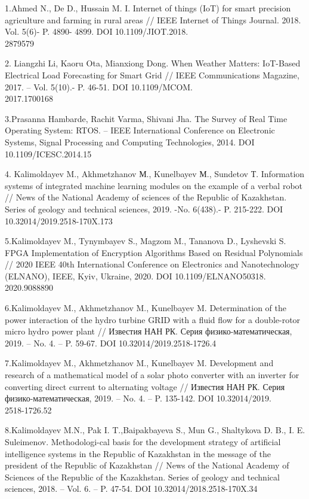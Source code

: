 \begin{noparindent}
1.Ahmed N., De D., Hussain M. I. Internet of things (IoT) for smart
precision agriculture and farming in rural areas // IEEE Internet of
Things Journal. 2018. Vol. 5(6)- P. 4890- 4899.
DOI 10.1109/JIOT.2018.\\2879579

2. Liangzhi Li, Kaoru Ota, Mianxiong Dong. When Weather Matters:
IoT-Based Electrical Load Forecasting for Smart Grid // IEEE
Communications Magazine, 2017. -- Vol. 5(10).- P. 46-51. DOI
10.1109/MCOM.\\2017.1700168

3.Prasanna Hambarde, Rachit Varma, Shivani Jha. The Survey of Real Time
Operating System: RTOS. -- IEEE International Conference on Electronic
Systems, Signal Processing and Computing Technologies, 2014. DOI
10.1109/ICESC.2014.15

4. Kalimoldayev M., Akhmetzhanov М., Kunelbayev М., Sundetov Т.
Information systems of integrated machine learning modules on the
example of a verbal robot // News of the National Academy of sciences of
the Republic of Kazakhstan. Series of geology and technical sciences,
2019. -No. 6(438).- P. 215-222. DOI 10.32014/2019.2518-170X.173

5.Kalimoldayev M., Tynymbayev S., Magzom M., Tananova D., Lyshevski S.
FPGA Implementation of Encryption Algorithms Based on Residual
Polynomials // 2020 IEEE 40th International Conference on Electronics
and Nanotechnology (ELNANO), IEEE, Kyiv, Ukraine, 2020. DOI
10.1109/ELNANO50318.\\2020.9088890

6.Kalimoldayev M., Akhmetzhanov M., Kunelbayev M. Determination of the
power interaction of the hydro turbine GRID with a fluid flow for a
double-rotor micro hydro power plant // Известия НАН РК. Серия
физико-математическая, 2019. -- No. 4. -- P. 59-67.
DOI 10.32014/2019.2518-1726.4

7.Kalimoldayev M., Akhmetzhanov M., Kunelbayev M. Development and
research of a mathematical model of a solar photo converter with an
inverter for converting direct current to alternating voltage //
Известия НАН РК. Серия физико-математическая, 2019. -- No. 4. -- P.
135-142. DOI 10.32014/2019.\\2518-1726.52

8.Kalimoldayev M.N., Pak I. T.,Baipakbayeva S., Mun G., Shaltykova D.
B., I. E. Suleimenov. 
Methodologi-cal basis for the development strategy of artificial
intelligence systems in the Republic of Kazakhstan in the message of the
president of the Republic of Kazakhstan // News of the National Academy
of Sciences of the Republic of the Kazakhstan. Series of geology and
technical sciences, 2018. -- Vol. 6. -- P. 47-54. DOI
10.32014/2018.2518-170X.34


\end{noparindent}
